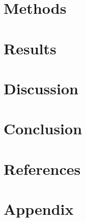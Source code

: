 \documentclass[a4paper, 11pt]{article}
\begin{document}
\section{Methods}

\pagebreak

\section{Results}

\pagebreak

\section{Discussion}

\pagebreak

\section{Conclusion}

\pagebreak

\section{References}
\printbibliography[heading=none]
\pagebreak


\section{Appendix}

\end{document}

